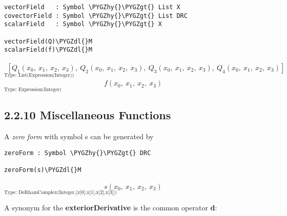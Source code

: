 \documentclass[letterpaper,10pt,english]{sphinxmanual}
\def\PYGZgt{\char`\>}
\def\PYGZdl{\char`\$}
\def\PYGZhy{\char`\-}
\begin{document}
\begin{Verbatim}[commandchars=\\\{\}]
vectorField   : Symbol \PYGZhy{}\PYGZgt{} List X
covectorField : Symbol \PYGZhy{}\PYGZgt{} List DRC
scalarField   : Symbol \PYGZhy{}\PYGZgt{} X

vectorField(Q)\PYGZdl{}M
scalarField(f)\PYGZdl{}M
\end{Verbatim}
\begin{equation*}
\begin{split}\left[
{{Q _ {1}}
\left(
{{x _ {0}}, \: {x _ {1}}, \: {x _ {2}}, \: {x _ {3}}}
\right)},
\: {{Q _ {2}}
\left(
{{x _ {0}}, \: {x _ {1}}, \: {x _ {2}}, \: {x _ {3}}}
\right)},
\: {{Q _ {3}}
\left(
{{x _ {0}}, \: {x _ {1}}, \: {x _ {2}}, \: {x _ {3}}}
\right)},
\: {{Q _ {4}}
\left(
{{x _ {0}}, \: {x _ {1}}, \: {x _ {2}}, \: {x _ {3}}}
\right)}
\right]\end{split}
\end{equation*}
$_{\text{Type: List(Expression(Integer))}}$
\begin{equation*}
\begin{split}f
\left(
 {{x _ {0}}, \: {x _ {1}}, \: {x _ {2}}, \: {x _ {3}}}
\right)\end{split}
\end{equation*}
$_{\text{Type: Expression(Integer)}}$


\subsection{2.2.10 Miscellaneous Functions}
\label{section-2.0:miscellaneous-functions}
A \emph{zero form} with symbol s can be generated by

\begin{Verbatim}[commandchars=\\\{\}]
zeroForm : Symbol \PYGZhy{}\PYGZgt{} DRC

zeroForm(s)\PYGZdl{}M
\end{Verbatim}
\begin{equation*}
\begin{split}s
\left(
 {{x _ {0}}, \: {x _ {1}}, \: {x _ {2}}, \: {x _ {3}}}
\right)\end{split}
\end{equation*}
$_{\text{Type: DeRhamComplex(Integer,{[}x{[}0{]},x{[}1{]},x{[}2{]},x{[}3{]}{]})}}$

A synonym for the \textbf{exteriorDerivative} is the common operator \textbf{d}:
\end{document}
